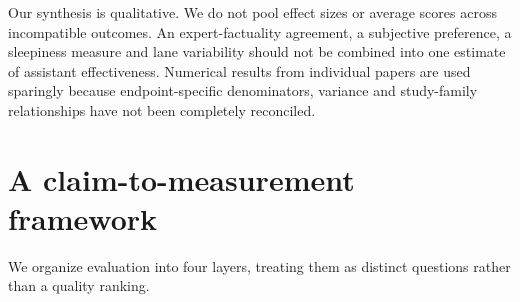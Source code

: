 \documentclass[11pt,a4paper]{article}
\begin{document}
Our synthesis is qualitative. We do not pool effect sizes or average
scores across incompatible outcomes. An expert-factuality agreement, a
subjective preference, a sleepiness measure and lane variability should
not be combined into one estimate of assistant effectiveness. Numerical
results from individual papers are used sparingly because
endpoint-specific denominators, variance and study-family relationships
have not been completely reconciled.

\section{A claim-to-measurement
framework}\label{a-claim-to-measurement-framework}

We organize evaluation into four layers, treating them as distinct
questions rather than a quality ranking.
\end{document}
